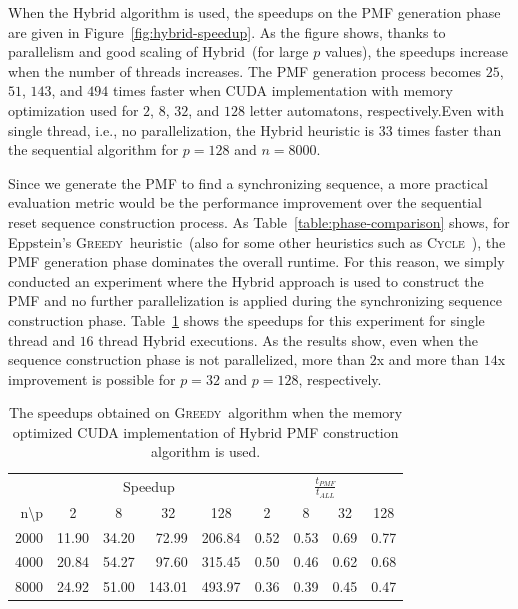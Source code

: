 \documentclass[12pt]{article}
\newcommand{\greedyAlgo}{\textsc{Greedy}}
\begin{document}
When the Hybrid algorithm is used, the speedups on the PMF generation phase are given in Figure~\ref{fig:hybrid-speedup}. As the figure shows, thanks to parallelism and good scaling of Hybrid~(for large $p$ values), the speedups increase when the number of threads increases. The PMF generation process becomes $25$, $51$, $143$, and $494$ times faster when CUDA implementation with memory optimization used for $2$, $8$, $32$, and $128$ letter automatons, respectively.Even with single thread, i.e., no parallelization, the Hybrid heuristic is $33$ times faster than the sequential algorithm for $p=128$ and $n=8000$.

Since we generate the PMF to find a synchronizing sequence, a more practical evaluation metric would be the performance improvement over the sequential reset sequence construction process. As Table~\ref{table:phase-comparison} shows, for Eppstein's \greedyAlgo\ heuristic~(also for some other heuristics such as \textsc{Cycle}~\cite{Trahtman04}), the PMF generation phase dominates the overall runtime. For this reason, we simply conducted an experiment where the Hybrid approach is used to construct the PMF and no further parallelization is applied during the synchronizing sequence construction phase. Table~\ref{table:phase-comparison-after} shows the speedups for this experiment for single thread and $16$ thread Hybrid executions. As the results show, even when the sequence construction phase is not parallelized, more than $2$x and more than $14$x improvement is possible for $p = 32$ and $p = 128$, respectively.

\begin{table}[ht]
	\center
	\begin{tabular}{r|rrrr||rrrr}
		& \multicolumn{4}{c||}{Speedup} & \multicolumn{4}{c}{$\frac{t_{PMF}}{t_{ALL}}$}\\ 
		n\textbackslash p  & \multicolumn{1}{c}{2} & \multicolumn{1}{c}{8} & \multicolumn{1}{c}{32} & \multicolumn{1}{c||}{128} & \multicolumn{1}{c}{2} & \multicolumn{1}{c}{8} & \multicolumn{1}{c}{32} & \multicolumn{1}{c}{128} \\ \hline
		2000 & 11.90 & 34.20 & 72.99 & 206.84 & 0.52 & 0.53 & 0.69 & 0.77 \\
		4000 & 20.84 & 54.27 & 97.60 & 315.45 & 0.50 & 0.46 & 0.62 & 0.68 \\
		8000 & 24.92 & 51.00 & 143.01 & 493.97 & 0.36 & 0.39 & 0.45 & 0.47 
	\end{tabular}
	\caption{The speedups obtained on \greedyAlgo\ algorithm when the memory optimized CUDA implementation of Hybrid PMF construction algorithm is used.}
	\label{table:phase-comparison-after}
\end{table}
\end{document}
